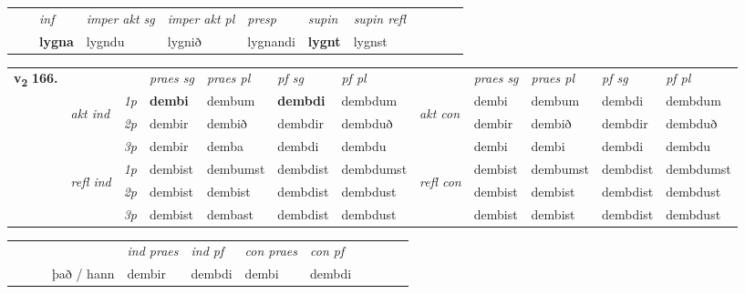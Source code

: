 \begin{tabular}{llllllllllll}
 & & \textit{inf} & \textit{imper akt sg} & \textit{imper akt pl}   & \textit{presp} & \textit{supin} & \textit{supin refl}      \\*
  & & \textbf{lygna} & lygndu  & lygnið   & lygnandi &  \textbf{lygnt} & lygnst  \\*
\cmidrule{1-12}
\end{tabular}



\begin{tabular}{llllllllllll} \toprule
\multirow{4}{*}{{{\textbf{v{\textsubscript{2}}} \Large{\textbf{166.}}}}}  & &   &  \textit{praes sg}  & \textit{praes pl}  &\textit{ pf sg} & \textit{pf pl} &  &  \textit{praes sg}  & \textit{praes pl}  & \textit{pf sg} & \textit{pf pl } \\*
	\cmidrule{4-7} \cmidrule{9-12}
 & \multirow{3}{*}{\begin{turn}{90}\textit{akt ind}\end{turn}} & {\textit{1p}} & \textbf{dembi} & dembum    & \textbf{dembdi} & dembdum & \multirow{3}{*}{\begin{turn}{90}\textit{akt con}\end{turn}} &dembi & dembum & dembdi & dembdum\\*
& &  {\textit{2p}} &  dembir  & dembið   & dembdir & dembduð & & dembir & dembið & dembdir & dembduð \\*
& &  {\textit{3p}} & dembir & demba   & dembdi & dembdu & & dembi & dembi& dembdi & dembdu  \\*
\cmidrule{4-7} \cmidrule{9-12}
 &\multirow{3}{*}{\begin{turn}{90}\textit{refl ind}\end{turn}} & {\textit{1p}} & dembist & dembumst    & dembdist & dembdumst & \multirow{3}{*}{\begin{turn}{90}\textit{refl con}\end{turn}}  &dembist & dembumst & dembdist & dembdumst\\*
 &&  {\textit{2p}} &  dembist  & dembist   & dembdist & dembdust & &dembist & dembist & dembdist & dembdust \\*
& &  {\textit{3p}} & dembist & dembast   & dembdist & dembdust & & dembist & dembist& dembdist & dembdust  \\*
\cmidrule{4-7} \cmidrule{9-12}
\end{tabular}


\begin{tabular}{llllllllllll}
 & &  & &  \textit{ind praes} & \textit{ind pf} & \textit{con praes} & \textit{con pf} \\*
&  & & það / hann & dembir & dembdi & dembi & dembdi \\*
\cmidrule{5-9}
\end{tabular}


